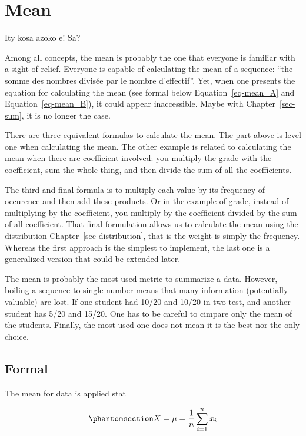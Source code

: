 \documentclass[
  letterpaper,
  DIV=11,
  numbers=noendperiod]{scrreprt}
\begin{document}
\chapter{Mean}\label{sec-mean}

Ity kosa azoko e! Sa?

Among all concepts, the mean is probably the one that everyone is
familiar with a sight of relief. Everyone is capable of calculating the
mean of a sequence: ``the somme des nombres divisée par le nombre
d'effectif''. Yet, when one presents the equation for calculating the
mean (see formal below Equation~\ref{eq-mean_A} and
Equation~\ref{eq-mean_B}), it could appear inaccessible. Maybe with
Chapter~\ref{sec-sum}, it is no longer the case.

There are three equivalent formulas to calculate the mean. The part
above is level one when calculating the mean. The other example is
related to calculating the mean when there are coefficient involved: you
multiply the grade with the coefficient, sum the whole thing, and then
divide the sum of all the coefficients.

The third and final formula is to multiply each value by its frequency
of occurence and then add these products. Or in the example of grade,
instead of multiplying by the coefficient, you multiply by the
coefficient divided by the sum of all coefficient. That final
formulation allows us to calculate the mean using the distribution
Chapter~\ref{sec-distribution}, that is the weight is simply the
frequency. Whereas the first approach is the simplest to implement, the
last one is a generalized version that could be extended later.

The mean is probably the most used metric to summarize a data. However,
boiling a sequence to single number means that many information
(potentially valuable) are lost. If one student had 10/20 and 10/20 in
two test, and another student has 5/20 and 15/20. One has to be careful
to cimpare only the mean of the students. Finally, the most used one
does not mean it is the best nor the only choice.

\section*{Formal}\label{formal-20}


The mean for data is applied stat

\begin{equation}\protect\phantomsection\label{eq-mean_A}{
   \bar{X} =  \mu = \frac{1}{n} \sum_{i=1}^{n} x_i
}\end{equation}
\end{document}
